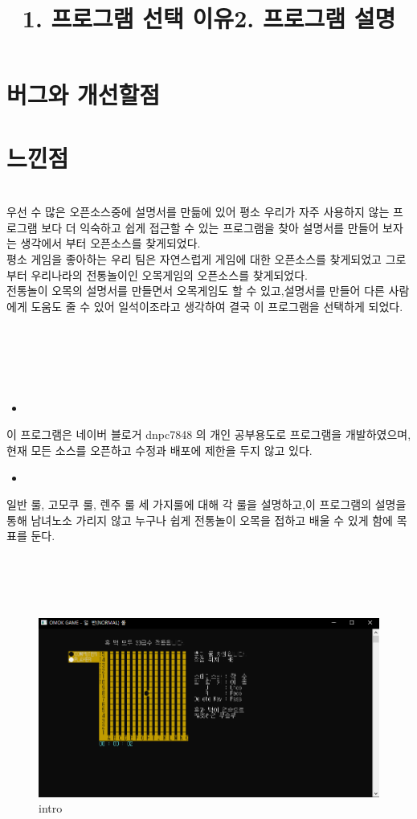 \documentclass[a4paper, 11pt]{article}
\begin{document}
	
	
	
	\vspace{1cm}
	\section{버그와 개선할점}
	
	\vspace{1cm}
	\section{느낀점}
	
	
   \newpage
	\title{\textbf{\Huge1. 프로그램 선택 이유}}\\
	
	{\Large
	우선 수 많은 오픈소스중에 설명서를 만듦에 있어 평소 우리가 자주 사용하지 않는 프로그램 보다 더 익숙하고 쉽게 접근할 수 있는 프로그램을 찾아 설명서를 만들어 보자는 생각에서 부터 오픈소스를 찾게되었다.\\
	평소 게임을 좋아하는 우리 팀은 자연스럽게 게임에 대한 오픈소스를 찾게되었고 그로부터 우리나라의 전통놀이인 오목게임의 오픈소스를 찾게되었다. \\
	전통놀이 오목의 설명서를 만들면서 오목게임도 할 수 있고,설명서를 만들어 다른 사람에게 도움도 줄 수 있어 일석이조라고 생각하여 결국 이 프로그램을 선택하게 되었다.
	}\\\\\\\\


	\newpage
	\title{\textbf{\Huge2. 프로그램 설명}}\\
	\begin{itemize}
		\item {} 
	\end{itemize}
	{\Large
	이 프로그램은 네이버 블로거 dnpc7848 의 개인 공부용도로 프로그램을 개발하였으며, 현재 모든 소스를 오픈하고 수정과 배포에 제한을 두지 않고 있다.\\
	}
	\begin{itemize}
		\item {}
	\end{itemize}
	{\Large
	일반 룰, 고모쿠 룰, 렌주 룰 세 가지룰에 대해 각 룰을 설명하고,이 프로그램의 설명을 통해
	남녀노소 가리지 않고 누구나 쉽게 전통놀이 오목을 접하고 배울 수 있게 함에 목표를 둔다.
	}\\\\\\\\\\

 \begin{figure}[h] %
	\begin{center}
		\includegraphics[width=1.0\linewidth]{intro.png}
	\end{center}
	\caption{intro}
	\label{fig:long}
	\label{fig:onecol}
\end{figure}
\end{document}
